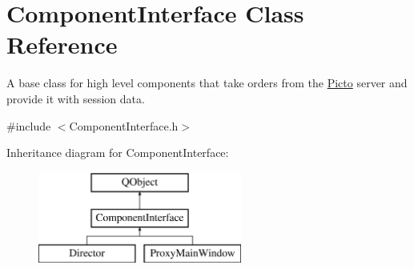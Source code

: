 \hypertarget{class_component_interface}{\section{Component\-Interface Class Reference}
\label{class_component_interface}
}


A base class for high level components that take orders from the \hyperlink{namespace_picto}{Picto} server and provide it with session data.  




{\ttfamily \#include $<$Component\-Interface.\-h$>$}

Inheritance diagram for Component\-Interface\-:\begin{figure}[H]
\begin{center}
\leavevmode
\includegraphics[height=3.000000cm]{class_component_interface}
\end{center}
\end{figure}
